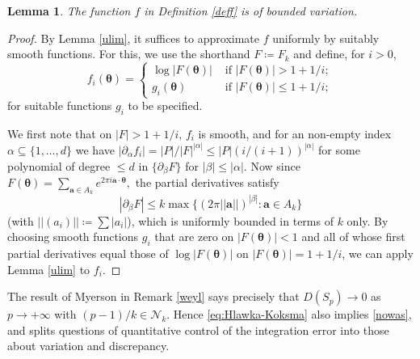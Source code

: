\documentclass[12pt,reqno]{amsart}
\theoremstyle{definition}
\theoremstyle{plain}
\newtheorem{lemma}[theorem]{Lemma}
\theoremstyle{definition}
\newcommand\vtheta{\boldsymbol{\theta}}
\renewcommand{\leq}{\leqslant}
\begin{document}
\begin{lemma} 
\label{lem:f is of bounded variation}
The function $f$ in Definition \ref{deff} is of bounded variation. 
\end{lemma} 

\begin{proof} 
By Lemma \ref{ulim}, it suffices to approximate $f$ uniformly by suitably smooth functions. For this, we use the shorthand $F\coloneqq F_k$ and define, for $i > 0$, 
$$ f_i(\vtheta) = 
\left\{ \begin{array}{ll} \log |F(\vtheta)| & \mbox{ if } |F(\vtheta)|> 1+1/i; \\
g_i(\vtheta)  & \mbox{ if } |F(\vtheta)| \leq 1+1/i; 
\end{array} \right. 
$$
for suitable functions $g_i$ to be specified.

We first note that on $|F|>1+1/i$,  $f_i$ is smooth, and for an non-empty index $\alpha \subseteq \{1,\dots,d\}$ we have $|\partial_\alpha f_i| = |P|/|F|^{|\alpha|} \leq |P| (i/(i+1))^{|\alpha|}$ for some polynomial of degree $\leq d$ in $\{\partial_\beta F\}$ for $|\beta|\leq |\alpha|$.  Now since $F(\vtheta) = \sum_{\mathbf a \in A_k} e^{2 \pi i \mathbf a \cdot \vtheta}, $ the partial derivatives satisfy $$|\partial_\beta F| \leq k \max\{ (2 \pi ||\mathbf a||)^{|\beta|} \colon \mathbf a \in A_k \}$$ (with $||(a_i)|| \coloneqq \sum |a_i|$), which is uniformly bounded in terms of $k$ only. 
By choosing smooth functions $g_i$ that are zero on $|F(\vtheta)|< 1$ and all of whose first partial derivatives equal those of $\log |F(\vtheta)|$ on  $|F(\vtheta)| = 1+1/i$, we can apply Lemma \ref{ulim} to $f_i$. 
\end{proof} 

The result of Myerson in Remark \ref{weyl} says precisely that $D(S_p) \rightarrow 0$ as $p \rightarrow +\infty$ with $(p-1)/k \in \mathcal N_k$. Hence \eqref{eq:Hlawka-Koksma} also implies \eqref{nowas}, and splits questions of quantitative control of the integration error into those about variation and discrepancy. 
\end{document}
